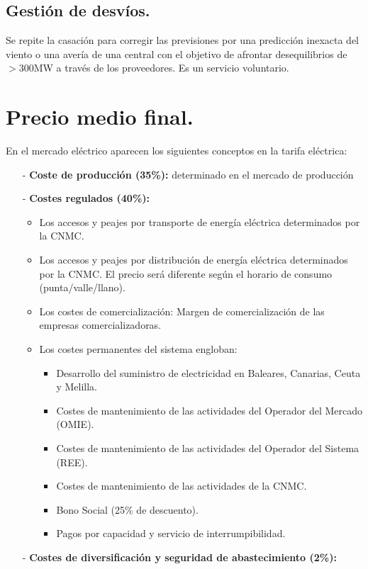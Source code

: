 \subsection{Gestión de desvíos.}
Se repite la casación para corregir las previsiones por una predicción inexacta del viento o una avería de una central con el objetivo de afrontar desequilibrios de $>$300MW a través de los proveedores. Es un servicio voluntario.

\section{Precio medio final.} 
En el mercado eléctrico aparecen los siguientes conceptos en la tarifa eléctrica:
\begin{itemize}
	\item [-]\textbf{Coste de producción (35\%):} determinado en el mercado de producción
	\item [-]\textbf{Costes regulados (40\%):} 
	\begin{itemize}
		\item Los accesos y peajes por transporte de energía eléctrica determinados por la
		CNMC.
		\item Los accesos y peajes por distribución de energía eléctrica determinados por la
		CNMC. El precio será diferente según el horario de consumo (punta/valle/llano).
		\item Los costes de comercialización: Margen de comercialización de las empresas
		comercializadoras.
		\item Los costes permanentes del sistema engloban:
		\begin{itemize}
			\item  Desarrollo del suministro de electricidad en Baleares, Canarias, Ceuta y Melilla.
			\item  Costes de mantenimiento de las actividades del Operador del Mercado (OMIE).
			\item Costes de mantenimiento de las actividades del Operador del Sistema (REE).
			\item Costes de mantenimiento de las actividades de la CNMC.
			\item Bono Social (25\% de descuento).
			\item Pagos por capacidad y servicio de interrumpibilidad.
		\end{itemize}
	\end{itemize}
	\item [-]\textbf{Costes de diversificación y seguridad de abastecimiento (2\%):}

\end{itemize}

